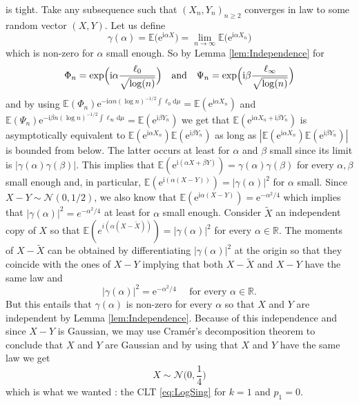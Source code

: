 \documentclass[10pt,reqno]{amsart}
\numberwithin{equation}{section}
\numberwithin{figure}{section}
\theoremstyle{plain}
\newcommand{\<}{\langle}
\renewcommand{\>}{\rangle}
\begin{document}
is tight. Take any subsequence such that
$(X_n,Y_n)_{n \geq 2}$ converges in law
to some random vector $(X,Y)$.
Let us define
\begin{equation}
\gamma(\alpha) = \mathbb E\big(\mathrm{e}^{\mathrm{i}\alpha X} \big)
= \lim_{n \to \infty} 
\mathbb E \big(\mathrm{e}^{\mathrm{i} \alpha X_n }\big)
\end{equation}
which is non-zero for $\alpha$ small enough.
So by Lemma \ref{lem:Independence} for
\begin{equation}
\Phi_n = \exp\Bigl(\mathrm{i}\alpha\frac{\ell_0}{\sqrt{\log(n)}}\Bigr)
\quad\text{and}\quad
\Psi_n = \exp\Bigl(\mathrm{i}\beta\frac{\ell_\infty}{\sqrt{\log(n)}}\Bigr)
\end{equation}
and by using
$\mathbb E(\Phi_n)
\mathrm{e}^{-\mathrm{i}\alpha n (\log n)^{-1/2}\int \ell_0 \mathrm{d} \mu}
= \mathbb E(\mathrm{e}^{\mathrm{i}\alpha X_n})$
and $\mathbb E(\Psi_n)
\mathrm{e}^{-\mathrm{i}\beta n (\log n)^{-1/2}\int \ell_\infty \mathrm{d} \mu}
= \mathbb E(\mathrm{e}^{\mathrm{i}\beta Y_n})$
we get that 
$\mathbb E(\mathrm{e}^{\mathrm{i}\alpha X_n + \mathrm{i}\beta Y_n})$
is asymptotically equivalent to
$\mathbb E(\mathrm{e}^{\mathrm{i}\alpha X_n}) \mathbb E(\mathrm{e}^{\mathrm{i}\beta Y_n})$
as long as 
$|\mathbb E(\mathrm{e}^{\mathrm{i}\alpha X_n}) \mathbb E(\mathrm{e}^{\mathrm{i}\beta Y_n})|$
is bounded from below.
The latter occurs at least for $\alpha$ and $\beta$ small since 
its limit is $|\gamma(\alpha) \gamma(\beta)|$.
This implies that
$\mathbb E(\mathrm{e}^{\mathrm{i}(\alpha X + \beta Y)})
=\gamma(\alpha) \gamma(\beta)$ for every $\alpha, \beta$ 
small enough and, in particular,
$\mathbb E(\mathrm{e}^{\mathrm{i}(\alpha (X - Y))})
=|\gamma(\alpha)|^2$ for $\alpha$ small.
Since 
$X-Y \sim \mathcal N(0,1/2)$,
we also know that 
$\mathbb E(\mathrm{e}^{\mathrm{i}\alpha(X-Y)})
= \mathrm{e}^{-\alpha^2/4}$
which implies that
$|\gamma(\alpha)|^2 = e^{-\alpha^2/4}$ at
least for $\alpha$ small enough.
Consider $\widetilde X$ an independent copy
of $X$ so that
$\mathbb E(e^{i(\alpha(X-\widetilde X))}) = 
|\gamma(\alpha)|^2$
for every $\alpha \in \mathbb R$.
%
%
%
%
The moments of  $X - \widetilde X$
can be obtained by differentiating
$|\gamma(\alpha)|^2$ at the origin so
that they coincide with the ones of
$X-Y$ implying that both $X-\widetilde X$ and $X - Y$ have the same law and
\[
|\gamma(\alpha)|^2 = \mathrm{e}^{-\alpha^2 /4} \quad \mbox{ for every } \alpha 
\in \mathbb R.
\]
But this entails that $\gamma(\alpha)$ is non-zero for every $\alpha$ so that
$X$ and $Y$ are independent
by Lemma \ref{lem:Independence}. Because of this independence and
since 
$X - Y$ is Gaussian, we may use Cramér's decomposition theorem
to conclude that $X$ and
$Y$ are Gaussian and by using that $X$ and $Y$ have the same law
we get
\begin{equation}
    X \sim \mathcal N \bigg(0,\frac{1}{4}\bigg)
\end{equation}
which is what we wanted : the CLT \eqref{eq:LogSing} for $k=1$ and $p_1=0$.
\end{document}
